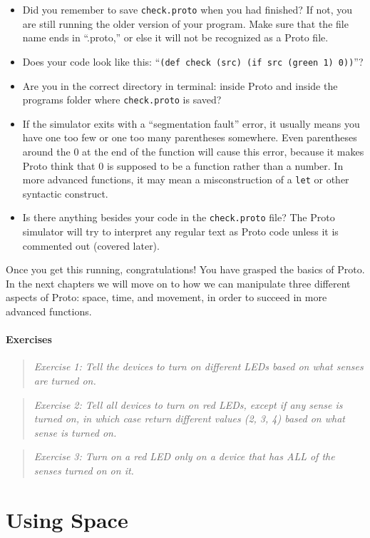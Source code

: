 \documentclass{article}
\newcommand\problem[1]{\begin{quote}{\em #1}\end{quote}}
\newcommand\var[1]{{\tt #1}}
\newcommand\qvar[1]{``{\tt #1}''}
\begin{document}
\begin{itemize}
\item Did you remember to save \var{check.proto} when you had
  finished? If not, you are still running the older version of your
  program. Make sure that the file name ends in ``.proto,'' or else it
  will not be recognized as a Proto file.
\item Does your code look like this: \qvar{(def check (src) (if src
    (green 1) 0))}?
\item Are you in the correct directory in terminal: inside Proto and
  inside the programs folder where \var{check.proto} is saved?
\item If the simulator exits with a ``segmentation fault'' error, it
  usually means you have one too few or one too many parentheses
  somewhere.  Even parentheses around the 0 at the end of the function
  will cause this error, because it makes Proto think that 0 is
  supposed to be a function rather than a number.  In more advanced
  functions, it may mean a misconstruction of a \var{let} or other
  syntactic construct.
\item Is there anything besides your code in the \var{check.proto}
  file? The Proto simulator will try to interpret any regular text as
  Proto code unless it is commented out (covered later).
\end{itemize}

Once you get this running, congratulations! You have grasped the
basics of Proto. In the next chapters we will move on to how we can
manipulate three different aspects of Proto: space, time, and
movement, in order to succeed in more advanced functions.

\paragraph{Exercises}

\problem{Exercise 1: Tell the devices to turn on different LEDs based
  on what senses are turned on.}

\problem{Exercise 2: Tell all devices to turn on red LEDs, except if
  any sense is turned on, in which case return different values (2, 3,
  4) based on what sense is turned on.}

\problem{Exercise 3: Turn on a red LED only on a device that has ALL
  of the senses turned on on it.}


\section{Using Space}
\label{s:space}
\end{document}
